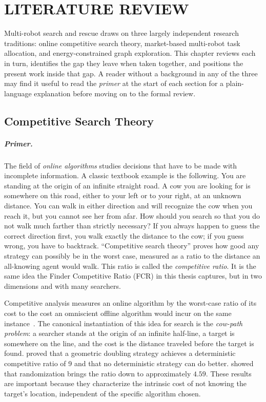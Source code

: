 \chapter{LITERATURE REVIEW}\label{ch:lit}

\begin{doublespacing}

Multi-robot search and rescue draws on three largely independent
research traditions: online competitive search theory, market-based
multi-robot task allocation, and energy-constrained graph
exploration. This chapter reviews each in turn, identifies the gap
they leave when taken together, and positions the present work
inside that gap. A reader without a background in any of the three
may find it useful to read the \emph{primer} at the start of each
section for a plain-language explanation before moving on to the
formal review.

\section{Competitive Search Theory}

\paragraph{Primer.} The field of \emph{online algorithms} studies
decisions that have to be made with incomplete information. A
classic textbook example is the following. You are standing at the
origin of an infinite straight road. A cow you are looking for is
somewhere on this road, either to your left or to your right, at an
unknown distance. You can walk in either direction and will
recognize the cow when you reach it, but you cannot see her from
afar. How should you search so that you do not walk much farther
than strictly necessary? If you always happen to guess the correct
direction first, you walk exactly the distance to the cow; if you
guess wrong, you have to backtrack. ``Competitive search theory''
proves how good any strategy can possibly be in the worst case,
measured as a ratio to the distance an all-knowing agent would
walk. This ratio is called the \emph{competitive ratio}. It is the
same idea the Finder Competitive Ratio (FCR) in this thesis
captures, but in two dimensions and with many searchers.

Competitive analysis measures an online algorithm by the worst-case
ratio of its cost to the cost an omniscient offline algorithm would
incur on the same instance~\citep{Sleator1985}. The canonical
instantiation of this idea for search is the \emph{cow-path problem}:
a searcher stands at the origin of an infinite half-line, a target is
somewhere on the line, and the cost is the distance traveled before
the target is found. \citet{BaezaYates1993} proved that a geometric doubling strategy
achieves a deterministic competitive ratio of 9 and that no
deterministic strategy can do better. \citet{Kao1996} showed that
randomization brings the ratio down to approximately $4.59$. These results are important because they
characterize the intrinsic cost of not knowing the target's location,
independent of the specific algorithm chosen.


\end{doublespacing}
